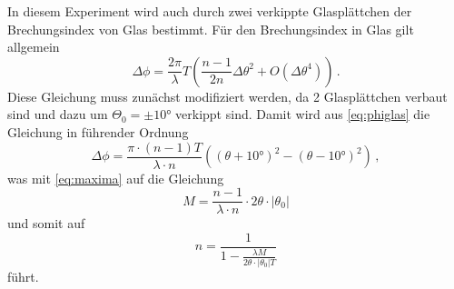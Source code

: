 In diesem Experiment wird auch durch zwei verkippte Glasplättchen der Brechungsindex von Glas bestimmt.
Für den Brechungsindex in Glas gilt allgemein \cite{v64}
\begin{equation}\label{eq:phiglas}
    \Delta \phi = \frac{2\pi}{\lambda}T\left(\frac{n-1}{2n}\Delta \theta^2+O( \Delta \theta^4)\right) \, .
\end{equation}
Diese Gleichung muss zunächst modifiziert werden, da 2 Glasplättchen verbaut sind und dazu um $\Theta_0 = \pm 10°$ verkippt sind.
Damit wird aus \autoref{eq:phiglas} die Gleichung in führender Ordnung
\begin{equation}
    \Delta \phi = \frac{\pi \cdot (n - 1) T}{\lambda \cdot n} \left(\left( \theta + 10° \right)^2 - \left( \theta - 10° \right)^2\right) \, ,
\end{equation}
was mit \autoref{eq:maxima} auf die Gleichung
\begin{equation*}
    M = \frac{n - 1}{\lambda \cdot n} \cdot 2 \theta \cdot |\theta_0|
\end{equation*}
und somit auf
\begin{equation} \label{eq:n_Glas}
    n = \frac{1}{1- \frac{\lambda M}{ 2 \theta \cdot |\theta_0| T}}
\end{equation}
führt.